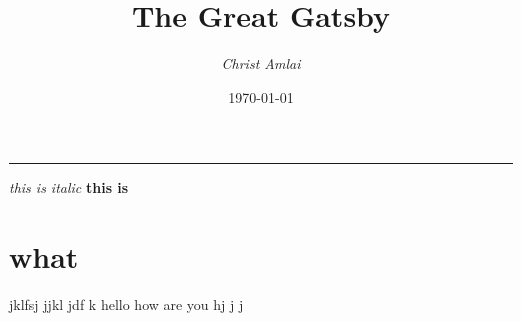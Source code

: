 \documentclass[11pt]{article}
\title{\textbf{The Great Gatsby}}
\author{\textit{Christ Amlai}}
\date{\today}
\begin{document}
\maketitle
\par\rule{\textwidth}{1pt}
\textit{this is italic}
\textbf{this is}
\section{what}
jklfsj
jjkl
jdf
k
hello how are you
hj
j
j
\end{document}
